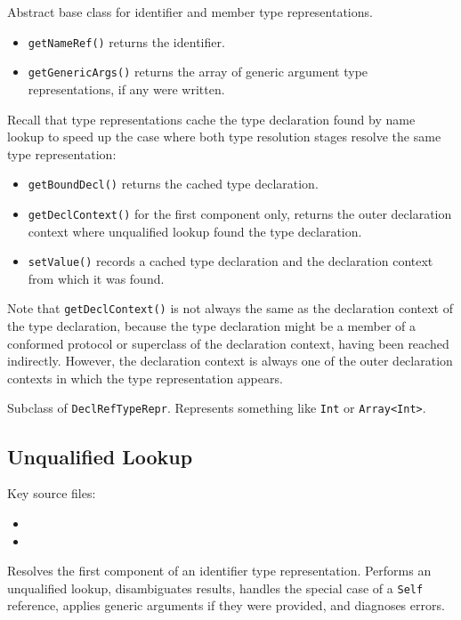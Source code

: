 \documentclass[../generics]{subfiles}
\begin{document}
Abstract base class for identifier and member type representations.
\begin{itemize}
\item \texttt{getNameRef()} returns the identifier.
\item \texttt{getGenericArgs()} returns the array of generic argument type representations, if any were written.
\end{itemize}
Recall that type representations cache the type declaration found by name lookup to speed up the case where both type resolution stages resolve the same type representation:
\begin{itemize}
\item \texttt{getBoundDecl()} returns the cached type declaration.
\item \texttt{getDeclContext()} for the first component only, returns the outer declaration context where unqualified lookup found the type declaration.
\item \texttt{setValue()} records a cached type declaration and the declaration context from which it was found.
\end{itemize}
Note that \texttt{getDeclContext()} is not always the same as the declaration context of the type declaration, because the type declaration might be a member of a conformed protocol or superclass of the declaration context, having been reached indirectly. However, the declaration context is always one of the outer declaration contexts in which the type representation appears.

Subclass of \texttt{DeclRefTypeRepr}. Represents something like \texttt{Int} or \texttt{Array<Int>}.

\subsection*{Unqualified Lookup}

Key source files:
\begin{itemize}
\item {}
\item {}
\end{itemize}

Resolves the first component of an identifier type representation. Performs an unqualified lookup, disambiguates results, handles the special case of a \texttt{Self} reference, applies generic arguments if they were provided, and diagnoses errors.
\end{document}
